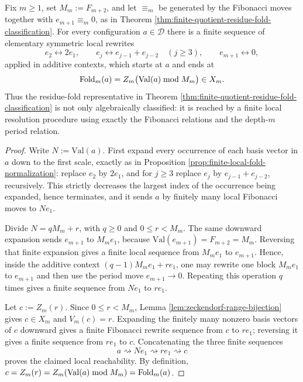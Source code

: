 \begin{proposition}\label{prop:finite-local-normalization-mod-F}
Fix \(m\ge 1\), set \(M_m:=F_{m+2}\), and let \(\equiv_m\) be generated by the Fibonacci moves together with \(e_{m+1}\equiv_m0\), as in Theorem \ref{thm:finite-quotient-residue-fold-classification}. For every configuration \(a\in\mathcal D\) there is a finite sequence of elementary symmetric local rewrites
\[
e_2\longleftrightarrow 2e_1,
\qquad
e_{j}\longleftrightarrow e_{j-1}+e_{j-2}\quad(j\ge3),
\qquad
e_{m+1}\longleftrightarrow 0,
\]
applied in additive contexts, which starts at \(a\) and ends at
\[
\operatorname{Fold}_m(a)=Z_m\bigl(\mathrm{Val}(a)\bmod M_m\bigr)\in X_m.
\]
Thus the residue-fold representative in Theorem \ref{thm:finite-quotient-residue-fold-classification} is not only algebraically classified: it is reached by a finite local resolution procedure using exactly the Fibonacci relations and the depth-\(m\) period relation.
\end{proposition}

\begin{proof}
Write \(N:=\mathrm{Val}(a)\). First expand every occurrence of each basis vector in \(a\) down to the first scale, exactly as in Proposition \ref{prop:finite-local-fold-normalization}: replace \(e_2\) by \(2e_1\), and for \(j\ge3\) replace \(e_j\) by \(e_{j-1}+e_{j-2}\), recursively. This strictly decreases the largest index of the occurrence being expanded, hence terminates, and it sends \(a\) by finitely many local Fibonacci moves to \(Ne_1\).

Divide \(N=qM_m+r\), with \(q\ge0\) and \(0\le r<M_m\). The same downward expansion sends \(e_{m+1}\) to \(M_me_1\), because \(\mathrm{Val}(e_{m+1})=F_{m+2}=M_m\). Reversing that finite expansion gives a finite local sequence from \(M_me_1\) to \(e_{m+1}\). Hence, inside the additive context \((q-1)M_me_1+re_1\), one may rewrite one block \(M_me_1\) to \(e_{m+1}\) and then use the period move \(e_{m+1}\to0\). Repeating this operation \(q\) times gives a finite sequence from \(Ne_1\) to \(re_1\).

Let \(c:=Z_m(r)\). Since \(0\le r<M_m\), Lemma \ref{lem:zeckendorf-range-bijection} gives \(c\in X_m\) and \(V_m(c)=r\). Expanding the finitely many nonzero basis vectors of \(c\) downward gives a finite Fibonacci rewrite sequence from \(c\) to \(re_1\); reversing it gives a finite sequence from \(re_1\) to \(c\). Concatenating the three finite sequences
\[
a\rightsquigarrow Ne_1\rightsquigarrow re_1\rightsquigarrow c
\]
proves the claimed local reachability. By definition, \(c=Z_m(r)=Z_m(\mathrm{Val}(a)\bmod M_m)=\operatorname{Fold}_m(a)\).
\end{proof}

